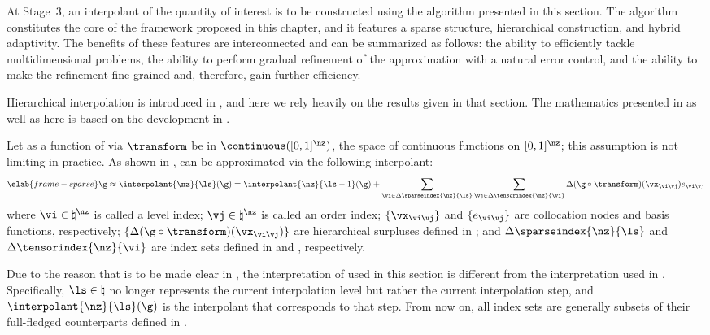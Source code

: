 At Stage~3, an interpolant of the quantity of interest is to be constructed
using the algorithm presented in this section. The algorithm constitutes the
core of the framework proposed in this chapter, and it features a sparse
structure, hierarchical construction, and hybrid adaptivity. The benefits of
these features are interconnected and can be summarized as follows: the ability
to efficiently tackle multidimensional problems, the ability to perform gradual
refinement of the approximation with a natural error control, and the ability to
make the refinement fine-grained and, therefore, gain further efficiency.

Hierarchical interpolation is introduced in , and
here we rely heavily on the results given in that section. The mathematics
presented in  as well as here is based on the
development in \cite{klimke2006, ma2009, jakeman2012}.

Let \g as a function of \vz via $\transform$ be in $\continuous([0, 1]^\nz)$,
the space of continuous functions on $[0, 1]^\nz$; this assumption is not
limiting in practice. As shown in , \g can be
approximated via the following interpolant:
\begin{equation} \elab{frame-sparse}
  \g \approx \interpolant{\nz}{\ls}(\g)
  = \interpolant{\nz}{\ls - 1}(\g) + \sum_{\vi \in \Delta\sparseindex{\nz}{\ls}}
  \sum_{\vj \in \Delta\tensorindex{\nz}{\vi}} \Delta(\g \circ \transform)(\vx_{\vi \vj}) e_{\vi \vj} \end{equation}
where $\vi \in \natural^\nz$ is called a level index; $\vj \in \natural^\nz$ is
called an order index; $\{ \vx_{\vi \vj} \}$ and $\{ e_{\vi \vj} \}$ are
collocation nodes and basis functions, respectively; $\{ \Delta(\g \circ
\transform)(\vx_{\vi \vj}) \}$ are hierarchical surpluses defined in
; and $\Delta\sparseindex{\nz}{\ls}$ and
$\Delta\tensorindex{\nz}{\vi}$ are index sets defined in
 and ,
respectively.

Due to the reason that is to be made clear in , the
interpretation of  used in this section is different from the
interpretation used in . Specifically, $\ls \in
\natural$ no longer represents the current interpolation level but rather the
current interpolation step, and $\interpolant{\nz}{\ls}(\g)$ is the interpolant
that corresponds to that step. From now on, all index sets are generally subsets
of their full-fledged counterparts defined in .

